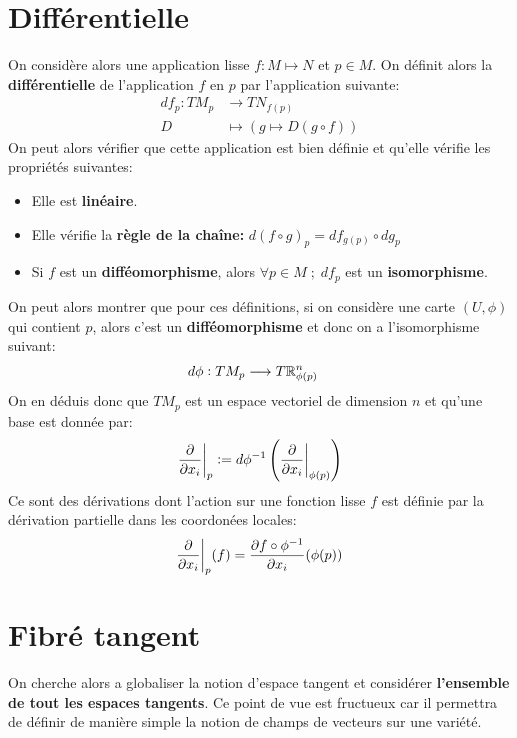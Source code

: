 \section{Différentielle}
On considère alors une application lisse \( f : M \longmapsto N \) et \( p \in M \). On définit alors la \textbf{différentielle} de l'application \( f \) en \( p \) par l'application suivante:
\[ 
   \begin{aligned}
      df_p : TM_p &\longrightarrow TN_{f(p)} \\
      D &\longmapsto \left( g \longmapsto D(g \circ f) \right)
   \end{aligned} 
\]
On peut alors vérifier que cette application est bien définie et qu'elle vérifie les propriétés suivantes:
\begin{itemize}
   \item Elle est \textbf{linéaire}.
   \item Elle vérifie la \textbf{règle de la chaîne:} \( d(f \circ g)_p = df_{g(p)} \circ dg_p \)
   \item Si \( f \) est un \textbf{difféomorphisme}, alors \( \forall p \in M \; ; \; df_p \) est un \textbf{isomorphisme}.
\end{itemize}
On peut alors montrer que pour ces définitions, si on considère une carte \( (U, \phi) \) qui contient \( p \), alors c'est un \textbf{difféomorphisme} et donc on a l'isomorphisme suivant:
\[ 
   \begin{aligned}
      d\phi : TM_p &\longrightarrow T\mathbb{R}_{\phi(p)}^n
   \end{aligned} 
\]
On en déduis donc que \( TM_p \) est un espace vectoriel de dimension \( n \) et qu'une base  est donnée par:
\[ 
   \frac{\partial }{\partial x_i}\biggr|_p := d\phi^{-1}\left( \frac{\partial }{\partial x_i}\biggr|_{\phi(p)}\right) 
\]
Ce sont des dérivations dont l'action sur une fonction lisse \( f \) est définie par la dérivation partielle dans les coordonées locales:
\[ 
   \frac{\partial }{\partial x_i}\biggr|_p(f) = \frac{\partial f \circ \phi^{-1}}{\partial x_i}(\phi(p))
\]
\pagebreak
\section{Fibré tangent}
On cherche alors a globaliser la notion d'espace tangent et considérer \textbf{l'ensemble de tout les espaces tangents}. Ce point de vue est fructueux car il permettra de définir de manière simple la notion de champs de vecteurs sur une variété.\< 

